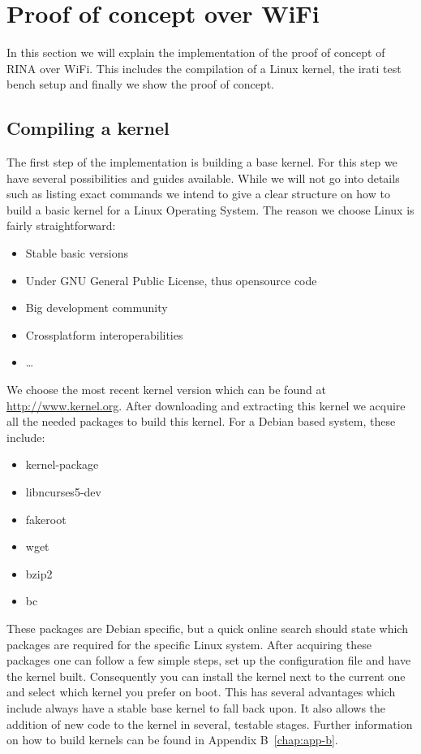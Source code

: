 \section{Proof of concept over WiFi}

In this section we will explain the implementation of the proof of concept of RINA over WiFi. This includes the compilation of a Linux kernel, the irati test bench setup and finally we show the proof of concept. 

\subsection{Compiling a kernel}

The first step of the implementation is building a base kernel. For this step we have several possibilities and guides available. While we will not go into details such as listing exact commands we intend to give a clear structure on how to build a basic kernel for a Linux Operating System. The reason we choose Linux is fairly straightforward:

\begin{itemize}
	\item Stable basic versions
	\item Under GNU General Public License, thus opensource code
	\item Big development community
	\item Crossplatform interoperabilities
	\item \ldots
\end{itemize}

We choose the most recent kernel version which can be found at \url{http://www.kernel.org}. After downloading and extracting this kernel we acquire all the needed packages to build this kernel. For a Debian based system, these include:

\begin{itemize}
	\item kernel-package
	\item libncurses5-dev
	\item fakeroot
	\item wget
	\item bzip2
	\item bc
\end{itemize}

These packages are Debian specific, but a quick online search should state which packages are required for the specific Linux system. After acquiring these packages one can follow a few simple steps, set up the configuration file and have the kernel built. Consequently you can install the kernel next to the current one and select which kernel you prefer on boot. This has several advantages which include always have a stable base kernel to fall back upon. It also allows the addition of new code to the kernel in several, testable stages. Further information on how to build kernels can be found in Appendix B~\ref{chap:app-b}.

